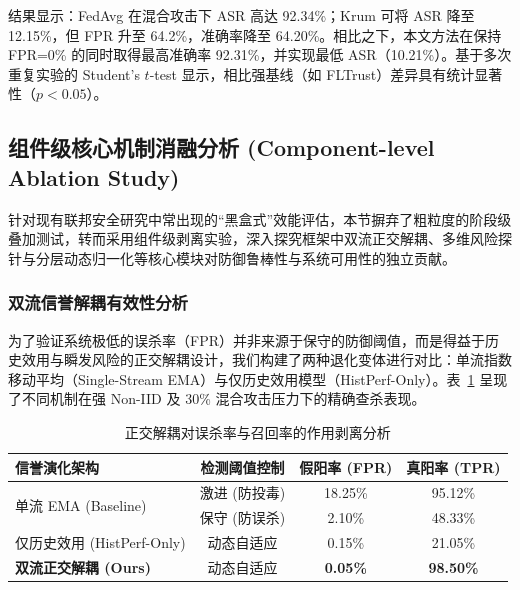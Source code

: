 \documentclass[11pt, a4paper, UTF8, fontset=fandol]{ctexart}
\begin{document}
结果显示：FedAvg 在混合攻击下 ASR 高达 92.34\%；Krum 可将 ASR 降至 12.15\%，但 FPR 升至 64.2\%，准确率降至 64.20\%。相比之下，本文方法在保持 FPR=0\% 的同时取得最高准确率 92.31\%，并实现最低 ASR（10.21\%）。基于多次重复实验的 Student's $t$-test 显示，相比强基线（如 FLTrust）差异具有统计显著性（$p<0.05$）。

\subsection{组件级核心机制消融分析 (Component-level Ablation Study)}
针对现有联邦安全研究中常出现的“黑盒式”效能评估，本节摒弃了粗粒度的阶段级叠加测试，转而采用组件级剥离实验，深入探究框架中双流正交解耦、多维风险探针与分层动态归一化等核心模块对防御鲁棒性与系统可用性的独立贡献。

\subsubsection{双流信誉解耦有效性分析}
为了验证系统极低的误杀率（FPR）并非来源于保守的防御阈值，而是得益于历史效用与瞬发风险的正交解耦设计，我们构建了两种退化变体进行对比：单流指数移动平均（Single-Stream EMA）与仅历史效用模型（HistPerf-Only）。表~\ref{tab:ablation_stream} 呈现了不同机制在强 Non-IID 及 30\% 混合攻击压力下的精确查杀表现。

\begin{table}[htbp]
    \centering
    \caption{正交解耦对误杀率与召回率的作用剥离分析}
    \label{tab:ablation_stream}
    \begin{tabular}{l c c c}
        \toprule
        \textbf{信誉演化架构}                & \textbf{检测阈值控制} & \textbf{假阳率 (FPR)} & \textbf{真阳率 (TPR)} \\
        \midrule
        \multirow{2}{*}{单流 EMA (Baseline)} & 激进 (防投毒)         & 18.25\%               & 95.12\%               \\
                                             & 保守 (防误杀)         & 2.10\%                & 48.33\%               \\
        \midrule
        仅历史效用 (HistPerf-Only)           & 动态自适应            & 0.15\%                & 21.05\%               \\
        \textbf{双流正交解耦 (Ours)}         & 动态自适应            & \textbf{0.05\%}       & \textbf{98.50\%}      \\
        \bottomrule
    \end{tabular}
\end{table}
\end{document}
